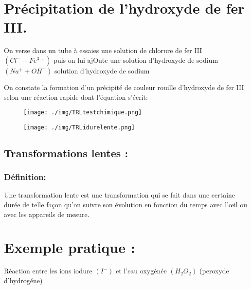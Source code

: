 \documentclass[12pt]{article}
\begin{document}
\section*{Précipitation de l'hydroxyde de fer III.}
On verse dans un tube à essaies une solution de chlorure de fer III $(Cl^- +Fe^{3+} )$ puis on lui ajOute une solution d'hydroxyde de sodium $(Na^+ + OH^-)$
solution d'hydroxyde de sodium

On constate la formation d'un précipité de couleur rouille d'hydroxyde de fer III selon une réaction rapide dont l'équation s'écrit: 

\begin{figure}[h!]
	\begin{center}
	\texttt{[image: ./img/TRLtestchimique.png]}

	\texttt{[image: ./img/TRLidurelente.png]}
\end{center}
\vspace{-1cm}
\end{figure}

\subsection{Transformations lentes :}
\subsubsection{Définition: }
Une transformation lente est une transformation qui se fait dans une certaine durée de telle façon qu'on suivre son évolution en
fonction du temps avec l'œil ou avec les appareils de mesure.

\section*{Exemple pratique :  }
Réaction entre les ions iodure $(I^-)$ et l'eau oxygénée $(H_2O_2)$ (peroxyde d'hydrogéne)
\end{document}
